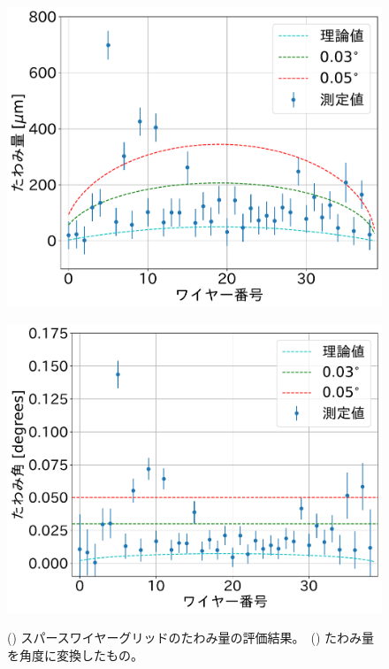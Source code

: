 \documentclass[../../main.tex]{subfiles}
\begin{document}
\begin{figure}[H]
    \begin{minipage}[b]{0.5\hsize}
        \centering
        \includegraphics[width=1.0\textwidth]{wiresag_swg/swg_sag_before.pdf}
        \subcaption{}
        \label{fig:wiresag_swg_sag_result}
    \end{minipage}
    \begin{minipage}[b]{0.5\hsize}
        \centering
        \includegraphics[width=1.0\textwidth]{wiresag_swg/swg_sag_angle_before.pdf}
        \subcaption{}
        \label{fig:wiresag_swg_sag_angle_result}
    \end{minipage}
    \caption{() スパースワイヤーグリッドのたわみ量の評価結果。\ 
             () たわみ量を角度に変換したもの。}
    \label{fig:wiresag_swg_result}
\end{figure}
\end{document}
